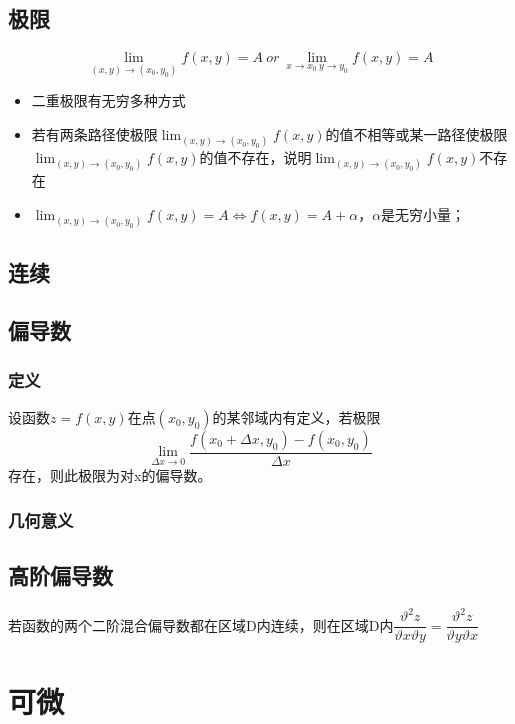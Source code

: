 \subsection{极限}
\[\lim_{(x, y) \to (x_0, y_0)}f(x, y) = A\ or\ \lim_{x\to x_0\ y \to y_0}f(x, y) = A\]

\begin{itemize}
    \item 二重极限有无穷多种方式
    \item 若有两条路径使极限\(\displaystyle\lim_{(x, y) \to (x_0, y_0)}f(x, y)\)的值不相等或某一路径使极限\(\displaystyle\lim_{(x, y) \to (x_0, y_0)}f(x, y)\)的值不存在，说明\(\displaystyle\lim_{(x, y) \to (x_0, y_0)}f(x, y)\)不存在
    \item \(\displaystyle\lim_{(x, y) \to (x_0, y_0)}f(x, y) = A \Leftrightarrow f(x, y) = A + \alpha\)，\(\alpha\)是无穷小量；
\end{itemize}


\subsection{连续}


\subsection{偏导数}

\subsubsection{定义}
设函数\(z = f(x, y)\)在点\((x_0, y_0)\)的某邻域内有定义，若极限\[\lim_{\Delta x \to 0}\dfrac{f(x_0 + \Delta x, y_0) - f(x_0, y_0)}{\Delta x}\]
存在，则此极限为对x的偏导数。


\subsubsection{几何意义}


\subsection{高阶偏导数}
若函数的两个二阶混合偏导数都在区域D内连续，则在区域D内\(\dfrac{\vartheta^2z}{\vartheta x\vartheta y} = \dfrac{\vartheta^2z}{\vartheta y\vartheta x}\)


\section{可微}

